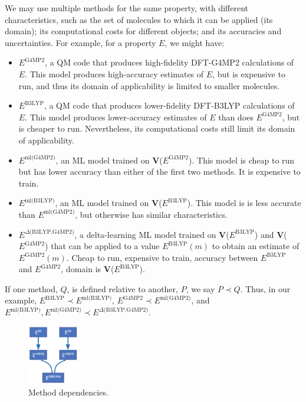\documentclass[10pt]{article}
\begin{document}
We may use multiple methods for the same property, with different characteristics, such as the set of molecules to which it can be applied (its domain); 
its computational costs for different objects; and its accuracies and uncertainties.
For example, for a property $E$, we might have:
\begin{itemize}\itemsep-0.2em 
\item
$E^{\textrm{G4MP2}}$, a QM code that produces high-fidelity DFT-G4MP2 calculations of $E$. 
This model produces high-accuracy estimates of $E$, but is expensive to run, and thus its domain of applicability is limited to smaller molecules.
\item
$E^{\textrm{B3LYP}}$, a QM code that produces lower-fidelity DFT-B3LYP calculations of $E$. This model produces lower-accuracy estimates of $E$ than
does $E^{\textrm{G4MP2}}$, but is cheaper to run. Nevertheless, its computational costs still limit its domain of applicability.
\item
$E^{\textrm{ml(G4MP2)}}$, an ML model trained on \textbf{V}($E^{\textrm{G4MP2}}$).
This model is cheap to run but has lower accuracy than either of the first two methods. It is expensive to train.
\item
$E^{\textrm{ml(B3LYP)}}$, an ML model trained on \textbf{V}($E^{\textrm{B3LYP}}$).
This model is is less accurate than $E^{\textrm{ml(G4MP2)}}$, but otherwise has similar characteristics.
\item
$E^{\textrm{$\Delta$(B3LYP,G4MP2)}}$, a delta-learning ML model trained on \textbf{V}($E^{\textrm{B3LYP}}$) and  \textbf{V}($E^{\textrm{G4MP2}}$) 
that can be applied to a value $E^{\textrm{B3LYP}}(m)$ to obtain an estimate of $E^{\textrm{G4MP2}}(m)$.
Cheap to run, expensive to train, accuracy between $E^{\textrm{B3LYP}}$ and $E^{\textrm{G4MP2}}$, domain is \textbf{V}($E^{\textrm{B3LYP}}$).
\end{itemize}

If one method, $Q$, is defined relative to another, $P$, we say $P\prec Q$.
Thus, in our example,
$E^{\textrm{B3LYP}} \prec E^{\textrm{ml(B3LYP)}}$, $E^{\textrm{G4MP2}} \prec E^{\textrm{ml(G4MP2)}}$, and
$E^{\textrm{ml(B3LYP)}}, E^{\textrm{ml(G4MP2)}} \prec E^{\textrm{$\Delta$(B3LYP,G4MP2)}}$.

\begin{figure}
\vspace{-2ex}
  \centering
  \includegraphics[width=0.2\textwidth,trim=0in 0in 0in 0in,clip]{./Figs/deps.png}
  \vspace{-4ex}
  \caption{Method dependencies.
\label{fig:deps}}
\end{figure}
\end{document}
